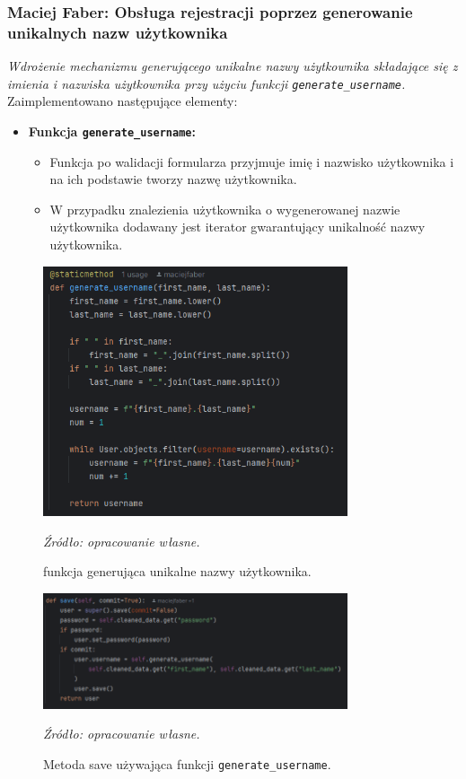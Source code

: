 \documentclass[12pt,a4paper,oneside]{article}
\theoremstyle{definition}
\numberwithin{equation}{section}
\begin{document}
\subsubsection{Maciej Faber: Obsługa rejestracji poprzez generowanie unikalnych nazw użytkownika}
\label{section:1.3.37}
\textit{
Wdrożenie mechanizmu generującego unikalne nazwy użytkownika składające się z imienia i nazwiska użytkownika przy użyciu funkcji \texttt{generate\_username}.
}
Zaimplementowano następujące elementy:
\begin{itemize}
    \item \textbf{Funkcja \texttt{generate\_username}:}
    \begin{itemize}
        \item Funkcja po walidacji formularza przyjmuje imię i nazwisko użytkownika i na ich podstawie tworzy nazwę użytkownika.
        \item W przypadku znalezienia użytkownika o wygenerowanej nazwie użytkownika dodawany jest iterator gwarantujący unikalność nazwy użytkownika.
    \end{itemize}
\end{itemize}
\begin{figure}[H]
    \centering
    \includegraphics[width=0.8\textwidth]{images/krzysztofBImages/genrate_usernama.png}
    \caption{funkcja generująca unikalne nazwy użytkownika.}
    \emph{Źródło: opracowanie własne.}
    \label{fig:username_generation}
\end{figure}
\begin{figure}[H]
    \centering
    \includegraphics[width=0.8\textwidth]{images/krzysztofBImages/register_save.png}
    \caption{Metoda save używająca funkcji \texttt{generate\_username}.}
    \emph{Źródło: opracowanie własne.}
    \label{fig:username_generation_use}
\end{figure}
%
%
\end{document}
